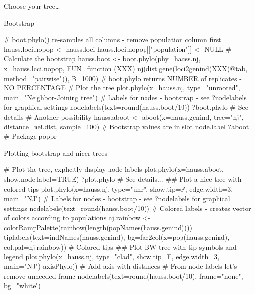 \documentclass[compress, ucs, xelatex, 11pt, xcolor=svgnames, aspectratio=169,
	hyperref={
		bookmarks=true,
		unicode=true,
		colorlinks=true,
		pdftitle={Molecular data in R},
		plainpages=false,
		pdfauthor={Vojtech Zeisek},
		pdfsubject={Course about phylogeny and evolution in R},
		pdfcreator={XeLaTeX},
		pdfkeywords={R, evolution, phylogeny, molecular data},
		linkcolor=Crimson, %
		anchorcolor=Magenta, %
		citecolor=Magenta, %
		filecolor=Magenta, %
		menucolor=Magenta, %
		urlcolor=DodgerBlue, %
		pdftex},
	url={hyphens, lowtilde} %
	]{beamer}
\renewcommand{\texttt}[1]{\colorbox{Beige}{{\ttfamily #1}}}
\begin{document}
\begin{frame}{Choose your tree\ldots}
	\begin{center}
		\texttt{[image: nj1.png]}
	\end{center}
\end{frame}

\begin{frame}[fragile]{Bootstrap}
	\begin{spluscode}
    # boot.phylo() re-samples all columns - remove population column first
    hauss.loci.nopop <- hauss.loci
    hauss.loci.nopop[["population"]] <- NULL
    # Calculate the bootstrap
    hauss.boot <- boot.phylo(phy=hauss.nj, x=hauss.loci.nopop, FUN=function
      (XXX) nj(dist.gene(loci2genind(XXX)@tab, method="pairwise")), B=1000)
    # boot.phylo returns NUMBER of replicates - NO PERCENTAGE
    # Plot the tree
    plot.phylo(x=hauss.nj, type="unrooted", main="Neighbor-Joining tree")
    # Labels for nodes - bootstrap - see ?nodelabels for graphical settings
    nodelabels(text=round(hauss.boot/10))
    ?boot.phylo # See details
    # Another possibility
    hauss.aboot <- aboot(x=hauss.genind, tree="nj", distance=nei.dist,
      sample=100) # Bootstrap values are in slot node.label
    ?aboot # Package poppr
	\end{spluscode}
\end{frame}

\begin{frame}[fragile]{Plotting bootstrap and nicer trees}
	\begin{spluscode}
    # Plot the tree, explicitly display node labels
    plot.phylo(x=hauss.aboot, show.node.label=TRUE)
    ?plot.phylo # See details...
    ## Plot a nice tree with colored tips
    plot.phylo(x=hauss.nj, type="unr", show.tip=F, edge.width=3, main="NJ")
    # Labels for nodes - bootstrap - see ?nodelabels for graphical settings
    nodelabels(text=round(hauss.boot/10))
    # Colored labels - creates vector of colors according to populations
    nj.rainbow <- colorRampPalette(rainbow(length(popNames(hauss.genind))))
    tiplabels(text=indNames(hauss.genind), bg=fac2col(x=pop(hauss.genind),
      col.pal=nj.rainbow)) # Colored tips
    ## Plot BW tree with tip symbols and legend
    plot.phylo(x=hauss.nj, type="clad", show.tip=F, edge.width=3, main="NJ")
    axisPhylo() # Add axis with distances
    # From node labels let's remove unneeded frame
    nodelabels(text=round(hauss.boot/10), frame="none", bg="white")
	\end{spluscode}
\end{frame}
\end{document}
